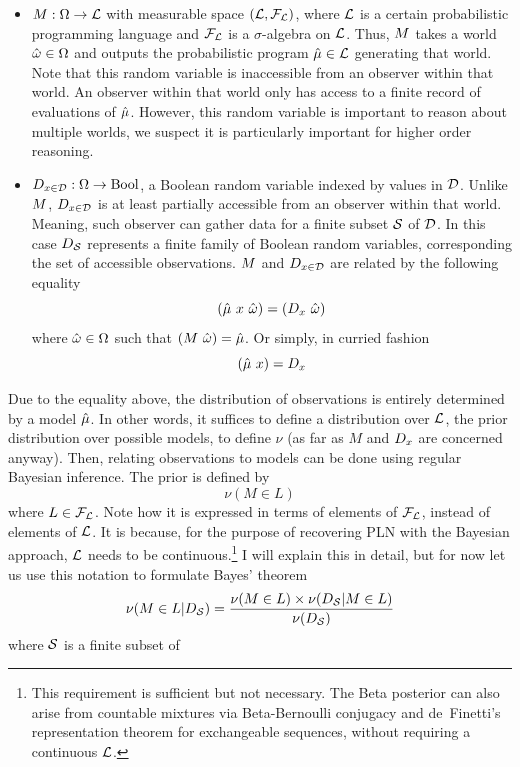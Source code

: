 \documentclass[]{article}
\begin{document}
\begin{itemize}
\item $M : \Omega \to \mathcal{L}$ with measurable space
  $(\mathcal{L}, \mathcal{F}_{\mathcal{L}})$, where $\mathcal{L}$ is a certain
  probabilistic programming language and $\mathcal{F}_{\mathcal{L}}$ is a
  $\sigma$-algebra on $\mathcal{L}$.  Thus, $M$ takes a world
  $\hat{\omega} \in \Omega$ and outputs the probabilistic program $\hat{\mu}
  \in \mathcal{L}$ generating that world.  Note that this random
  variable is inaccessible from an observer within that world.  An
  observer within that world only has access to a finite record of
  evaluations of $\hat{\mu}$.  However, this random variable is important
  to reason about multiple worlds, we suspect it is particularly
  important for higher order reasoning.
\item $D_{x\in\mathcal{D}} : \Omega \to \textup{Bool}$, a Boolean random variable indexed
  by values in $\mathcal{D}$.  Unlike $M$, $D_{x\in\mathcal{D}}$ is at least
  partially accessible from an observer within that world.  Meaning,
  such observer can gather data for a finite subset $\mathcal{S}$ of
  $\mathcal{D}$.  In this case $D_{\mathcal{S}}$ represents a finite family of
  Boolean random variables, corresponding the set of accessible
  observations.  $M$ and $D_{x\in\mathcal{D}}$ are related by the following
  equality
  $$(\anymu\ x\ \anyomega) = (\Datax\ \anyomega)$$ where $\hat{\omega}
  \in \Omega$ such that $(M\ \hat{\omega}) = \hat{\mu}$.  Or simply, in
  curried fashion
  $$(\hat{\mu}\ x) = D_x$$
\end{itemize}
Due to the equality above, the distribution of observations is
entirely determined by a model $\hat{\mu}$.  In other words, it suffices
to define a distribution over $\mathcal{L}$, the prior distribution over
possible models, to define $\nu$ (as far as $M$ and $D_x$ are
concerned anyway).  Then, relating observations to models can be done
using regular Bayesian inference.  The prior is defined by
$$\nu(M \in L)$$ where $L \in \mathcal{F}_{\mathcal{L}}$.  Note how it is
expressed in terms of elements of $\mathcal{F}_{\mathcal{L}}$, instead of
elements of $\mathcal{L}$.  It is because, for the purpose of recovering
PLN with the Bayesian approach, $\mathcal{L}$ needs to be continuous.\footnote{This requirement is sufficient but not necessary. The Beta posterior can also arise from countable mixtures via Beta-Bernoulli conjugacy and de~Finetti's representation theorem for exchangeable sequences, without requiring a continuous $\mathcal{L}$.}  I
will explain this in detail, but for now let us use this notation to
formulate Bayes' theorem
$$\nu(M \in L | D_{\mathcal{S}}) = \frac{\nu(M \in L) \times \nu(D_{\mathcal{S}} | M \in
  L)}{\nu(D_{\mathcal{S}})}$$ where $\mathcal{S}$ is a finite subset of
\end{document}
